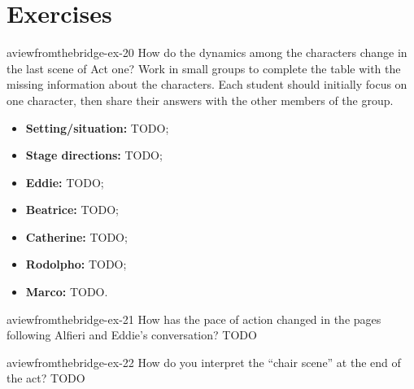 \documentclass[preview]{standalone}
\begin{document}
\genpage

\section{Exercises}

\begin{snippetexercise}{aviewfromthebridge-ex-20}
{How do the dynamics among the characters change in the last scene of Act one? Work in small
groups to complete the table with the missing information about the characters. Each student
should initially focus on one character, then share their answers with the other members of the
group.}
\begin{itemize}
    \item \textbf{Setting/situation:} TODO;
    \item \textbf{Stage directions:} TODO;
    \item \textbf{Eddie:} TODO;
    \item \textbf{Beatrice:} TODO;
    \item \textbf{Catherine:} TODO;
    \item \textbf{Rodolpho:} TODO;
    \item \textbf{Marco:} TODO.
\end{itemize}
\end{snippetexercise}

\begin{snippetexercise}{aviewfromthebridge-ex-21}
{How has the pace of action changed in the pages following Alfieri and Eddie's conversation?}
TODO
\end{snippetexercise}

\begin{snippetexercise}{aviewfromthebridge-ex-22}
{How do you interpret the “chair scene” at the end of the act?}
TODO
\end{snippetexercise}
\end{document}
